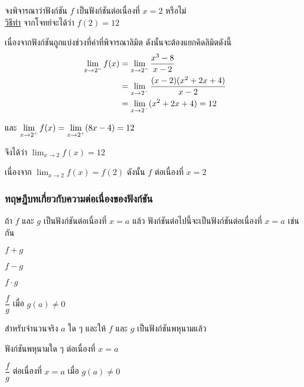 \documentclass[hidelinks,12pt,a4paper]{article}
\newcommand{\s}{\space}
\newcommand{\qed}{\scalebox{0.8}{$\blacksquare$}}
\begin{document}
จงพิจารณาว่าฟังก์ชัน $f$ เป็นฟังก์ชันต่อเนื่องที่ $x=2$ หรือไม่ \\[1ex]
\underline{\underline{วิธีทำ}}\hspace{8mm} จากโจทย์จะได้ว่า \s $f(2) = 12$

\hspace{15mm} เนื่องจากฟังก์ชันถูกแบ่งช่วงที่ค่าที่พิจารณาลิมิต ดังนั้นจะต้องแยกคิดลิมิตดังนี้
\begin{align*}
    \lim_{x\to 2^{\scalebox{0.6}{$-$}}} f(x) & = \lim_{x\to 2^{\scalebox{0.6}{$-$}}} \frac{x^3-8}{x-2} \\
    & = \lim_{x\to 2^{\scalebox{0.6}{$-$}}} \frac{(x-2)(x^2+2x+4)}{x-2} \\
    & = \lim_{x\to 2^{\scalebox{0.6}{$-$}}} (x^2+2x+4) = 12
\end{align*}

\hspace{15mm} และ $\displaystyle\lim_{x\to 2^{\scalebox{0.6}{$+$}}} f(x) = \displaystyle\lim_{x\to 2^{\scalebox{0.6}{$+$}}} (8x-4) = 12$

\hspace{15mm} จึงได้ว่า $\displaystyle\lim_{x\to2} f(x)=12$

\hspace{15mm} เนื่องจาก $\displaystyle\lim_{x\to2} f(x) = f(2)$ \s ดังนั้น $f$ ต่อเนื่องที่ $x=2$ \hfill \qed

\subsubsection{ทฤษฎีบทเกี่ยวกับความต่อเนื่องของฟังก์ชัน}
\begin{tcolorbox}[sharp corners, colback=green!30, colframe=green!80!blue, title=\textbf{ทฤษฎีบท (ความต่อเนื่อง)}]
    ถ้า $f$ และ $g$ เป็นฟังก์ชันต่อเนื่องที่ $x=a$ แล้ว  ฟังก์ชันต่อไปนี้จะเป็นฟังก์ชันต่อเนื่องที่ $x=a$ เช่นกัน
    \begin{itemize}
        \begin{multicols}{2}
            \item $f+g$
            \item $f-g$
            \item $f\cdot g$
            \item $\dfrac{f}{g}$ เมื่อ $g(a)\neq0$
        \end{multicols}
    \end{itemize}
    \vspace{2mm}
    สำหรับจำนวนจริง $a$ ใด ๆ และให้ $f$ และ $g$ เป็นฟังก์ชันพหุนามแล้ว
    \begin{itemize}
        \begin{multicols}{2}
            \item ฟังก์ชันพหุนามใด ๆ ต่อเนื่องที่ $x=a$
            \item $\dfrac{f}{g}$ ต่อเนื่องที่ $x=a$ เมื่อ $g(a)\neq0$
        \end{multicols}
    \end{itemize}
\end{tcolorbox}
\end{document}

